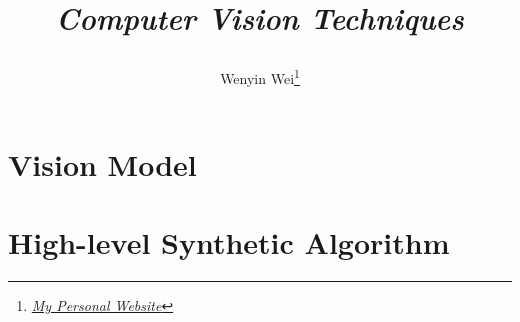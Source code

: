 \documentclass[10pt]{article}
\title{\begin{center}{\Huge \textit{Computer Vision Techniques}}\end{center}}
\author{Wenyin Wei\footnote{\href{https://wenyin.xyz/}{\textit{My Personal Website}}}}
\affiliation{
Tsinghua University\\
Department of Engineering Physics
}
\begin{document}
	\maketitle
	\flushbottom
	\newpage
	\pagestyle{fancynotes}

	\part{Vision Model}
	
	\part{High-level Synthetic Algorithm}
	
\end{document}
